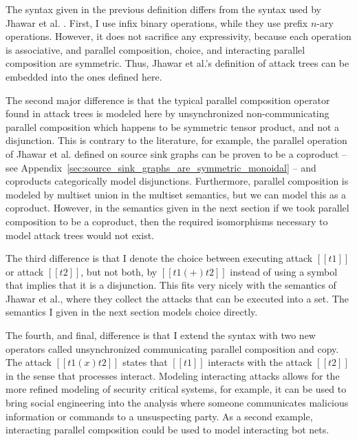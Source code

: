 \documentclass{llncs}
\begin{document}
The syntax given in the previous definition differs from the syntax
used by Jhawar et al. \cite{Jhawar:2015}.  First, I use infix binary
operations, while they use prefix $n$-ary operations. However, it does
not sacrifice any expressivity, because each operation is associative,
and parallel composition, choice, and interacting parallel composition
are symmetric.  Thus, Jhawar et al.'s definition of attack trees can
be embedded into the ones defined here.%

The second major difference is that the typical parallel composition
operator found in attack trees is modeled here by unsynchronized
non-communicating parallel composition which happens to be symmetric
tensor product, and not a disjunction.  This is contrary to the
literature, for example, the parallel operation of Jhawar et
al. defined on source sink graphs \cite{Jhawar:2015} can be proven to
be a coproduct -- see
Appendix~\ref{sec:source_sink_graphs_are_symmetric_monoidal} -- and
coproducts categorically model disjunctions.  Furthermore, parallel
composition is modeled by multiset union in the multiset semantics,
but we can model this as a coproduct.  However, in the semantics given
in the next section if we took parallel composition to be a coproduct,
then the required isomorphisms necessary to model attack trees would
not exist.

The third difference is that I denote the choice between executing
attack $[[t1]]$ or attack $[[t2]]$, but not both, by $[[t1 (+) t2]]$
instead of using a symbol that implies that it is a disjunction.  This
fits very nicely with the semantics of Jhawar et al., where they
collect the attacks that can be executed into a set.  The semantics I
given in the next section models choice directly.

The fourth, and final, difference is that I extend the syntax with two
new operators called unsynchronized communicating parallel composition
and copy.  The attack $[[t1 (x) t2]]$ states that $[[t1]]$ interacts
with the attack $[[t2]]$ in the sense that processes interact.
Modeling interacting attacks allows for the more refined modeling of
security critical systems, for example, it can be used to bring social
engineering into the analysis where someone communicates malicious
information or commands to a unsuspecting party.  As a second example,
interacting parallel composition could be used to model interacting
bot nets.
\end{document}
